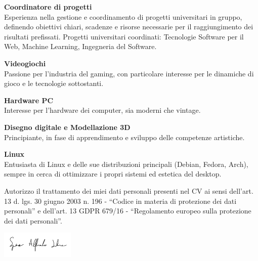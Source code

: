 \documentclass[10pt]{developercv} %
\begin{document}


\textbf{Coordinatore di progetti}\\
Esperienza nella gestione e coordinamento di progetti universitari in gruppo, definendo obiettivi chiari, scadenze e risorse necessarie per il raggiungimento dei risultati prefissati. Progetti universitari coordinati: Tecnologie Software per il Web, Machine Learning, Ingegneria del Software.


\textbf{Videogiochi}\\
Passione per l'industria del gaming, con particolare interesse per le dinamiche di gioco e le tecnologie sottostanti.

\vspace{\baselineskip}

\textbf{Hardware PC}\\
Interesse per l'hardware dei computer, sia moderni che vintage.

\vspace{\baselineskip}

\textbf{Disegno digitale e Modellazione 3D}\\
Principiante, in fase di apprendimento e sviluppo delle competenze artistiche.

\vspace{\baselineskip}

\textbf{Linux}\\
Entusiasta di Linux e delle sue distribuzioni principali (Debian, Fedora, Arch), sempre in cerca di ottimizzare i propri sistemi ed estetica del desktop.




\vfill
\footnotesize{Autorizzo il trattamento dei miei dati personali presenti nel CV ai sensi dell'art. 13 d. lgs. 30 giugno 2003 n. 196 - “Codice in materia di protezione
dei dati personali” e dell'art. 13 GDPR 679/16 - “Regolamento europeo sulla protezione dei dati personali”.}

\begin{flushright}
	\includegraphics[width=3.5cm]{images/firma.png}
\end{flushright}
\end{document}
